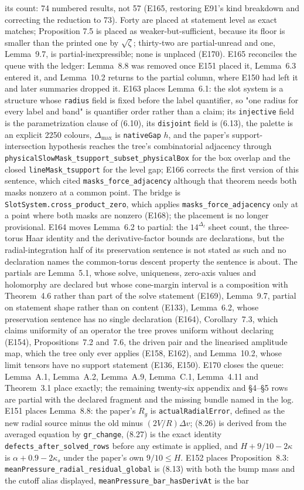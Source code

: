 \documentclass[11pt]{article}
\newcommand{\ct}[1]{\texttt{#1}}
\theoremstyle{plain}
\theoremstyle{definition}
\theoremstyle{remark}
\begin{document}
its count: 74 numbered results, not 57 (E165, restoring E91's kind breakdown and correcting the reduction to 73). Forty are placed at statement level as exact matches; Proposition 7.5 is placed as weaker-but-sufficient, because its floor is smaller than the printed one by $\sqrt{\zeta}$; thirty-two are partial-unread and one, Lemma~9.7, is partial-inexpressible; none is unplaced (E170). E165 reconciles the queue with the ledger: Lemma~8.8 was removed once E151 placed it, Lemma~6.3 entered it, and Lemma~10.2 returns to the partial column, where E150 had left it and later summaries dropped it. E163 places Lemma~6.1: the slot system is a structure whose \ct{radius} field is fixed before the label quantifier, so "one radius for every label and band" is quantifier order rather than a claim; its \ct{injective} field is the parametrization clause of (6.10), its \ct{disjoint} field is (6.13), the palette is an explicit 2250 colours, $\Delta_{\max}$ is \ct{nativeGap} $h$, and the paper's support-intersection hypothesis reaches the tree's combinatorial adjacency through \ct{physicalSlowMask\_tsupport\_subset\_physicalBox} for the box overlap and the closed \ct{lineMask\_tsupport} for the level gap; E166 corrects the first version of this sentence, which cited \ct{masks\_force\_adjacency} although that theorem needs both masks nonzero at a common point. The bridge is \ct{SlotSystem.cross\_product\_zero}, which applies \ct{masks\_force\_adjacency} only at a point where both masks are nonzero (E168); the placement is no longer provisional. E164 moves Lemma~6.2 to partial: the $14^{\Delta_\ell}$ sheet count, the three-torus Haar identity and the derivative-factor bounds are declarations, but the radial-integration half of its preservation sentence is not stated as such and no declaration names the common-torus descent property the sentence is about. The partials are Lemma~5.1, whose solve, uniqueness, zero-axis values and holomorphy are declared but whose cone-margin interval is a composition with Theorem~4.6 rather than part of the solve statement (E169), Lemma~9.7, partial on statement shape rather than on content (E133), Lemma~6.2, whose preservation sentence has no single declaration (E164), Corollary~7.3, which claims uniformity of an operator the tree proves uniform without declaring (E154), Propositions~7.2 and~7.6, the driven pair and the linearised amplitude map, which the tree only ever applies (E158, E162), and Lemma~10.2, whose limit tensors have no support statement (E136, E150). E170 closes the queue: Lemma~A.1, Lemma~A.2, Lemma~A.9, Lemma~C.1, Lemma~4.11 and Theorem~3.1 place exactly; the remaining twenty-six appendix and \S4--\S5 rows are partial with the declared fragment and the missing bundle named in the log. E151 places Lemma~8.8: the paper's $R_g$ is \ct{actualRadialError}, defined as the new radial source minus the old minus $(2V/R)\Delta v$; (8.26) is derived from the averaged equation by \ct{gr\_change}, (8.27) is the exact identity \ct{defects\_after\_solved\_rows} before any estimate is applied, and $H+9/10-2\kappa$ is $\alpha+0.9-2\kappa_s$ under the paper's own $9/10 \le H$. E152 places Proposition~8.3: \ct{meanPressure\_radial\_residual\_global} is (8.13) with both the bump mass and the cutoff alias displayed, \ct{meanPressure\_bar\_hasDerivAt} is the bar 
\end{document}

